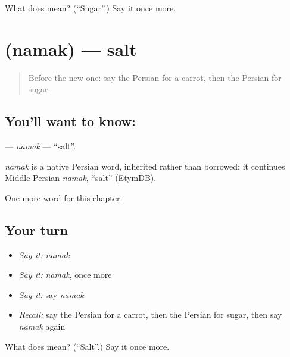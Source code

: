 \begin{tcolorbox}[breakable,colback=teal!4,colframe=teal!35!black,title={Before you move on}]
What does  mean? (\textquotedblleft{}Sugar\textquotedblright{}.) Say it once more.
\end{tcolorbox}
\section[\texorpdfstring{\fa{نمک} (namak)}{نمک (namak)}]{ (namak) — salt}

\label{lesson:FA-C42-namak}



\begin{quote}
Before the new one: say the Persian for a carrot, then the Persian for sugar.
\end{quote}

\subsection*{You'll want to know: }
\textbf{} — \emph{namak} — \textquotedblleft{}salt\textquotedblright{}.

\begin{cousinweb}
\emph{namak} is a native Persian word, inherited rather than borrowed: it continues Middle Persian \emph{namak}, \textquotedblleft{}salt\textquotedblright{} (EtymDB).
\end{cousinweb}

\begin{grammarlens}[title={What you've built}]
One more word for this chapter.
\end{grammarlens}

\subsection*{Your turn}
\begin{itemize}
\raggedright
  \item \emph{Say it:} \emph{namak}
  \item \emph{Say it:} \emph{namak}, once more
  \item \emph{Say it:} say \emph{namak}
  \item \emph{Recall:} say the Persian for a carrot, then the Persian for sugar, then say \emph{namak} again
\end{itemize}

\begin{tcolorbox}[breakable,colback=teal!4,colframe=teal!35!black,title={Before you move on}]
What does  mean? (\textquotedblleft{}Salt\textquotedblright{}.) Say it once more.
\end{tcolorbox}
